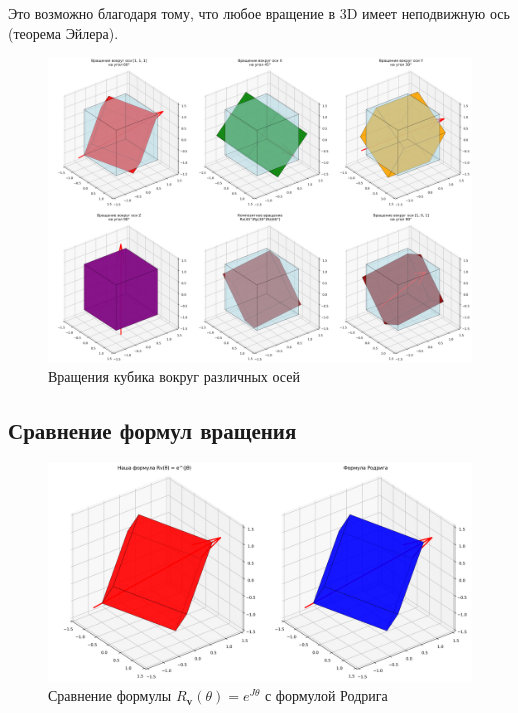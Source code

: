 Это возможно благодаря тому, что любое вращение в 3D имеет неподвижную ось (теорема Эйлера).

\begin{figure}[h]
\centering
\includegraphics[width=\textwidth]{images/task4/rotation_transformations.png}
\caption{Вращения кубика вокруг различных осей}
\label{fig:rotation_transformations}
\end{figure}

\subsection*{Сравнение формул вращения}

\begin{figure}[h]
\centering
\includegraphics[width=\textwidth]{images/task4/rotation_formula_comparison.png}
\caption{Сравнение формулы $R_{\mathbf{v}}(\theta) = e^{J\theta}$ с формулой Родрига}
\label{fig:rotation_formula_comparison}
\end{figure}

